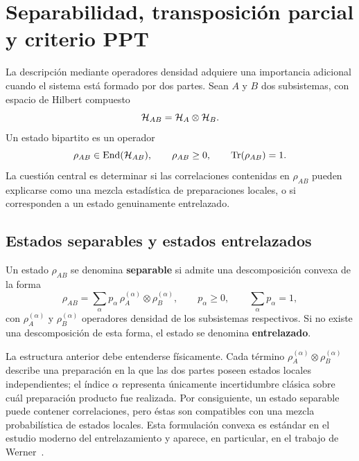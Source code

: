 \documentclass[../main.tex]{subfiles}
\begin{document}
\chapter{Separabilidad, transposición parcial y criterio PPT}\label{sec:separabilidad-ppt}

La descripción mediante operadores densidad adquiere una importancia adicional cuando el sistema está formado por dos partes. Sean $A$ y $B$ dos subsistemas, con espacio de Hilbert compuesto
\begin{equation*}
    \mathcal{H}_{AB}=\mathcal{H}_A\otimes\mathcal{H}_B.
\end{equation*}
Un estado bipartito es un operador
\begin{equation*}
    \rho_{AB}\in \operatorname{End}(\mathcal{H}_{AB}),
    \qquad
    \rho_{AB}\geq 0,
    \qquad
    \Tr(\rho_{AB})=1.
\end{equation*}
La cuestión central es determinar si las correlaciones contenidas en $\rho_{AB}$ pueden explicarse como una mezcla estadística de preparaciones locales, o si corresponden a un estado genuinamente entrelazado.

\section{Estados separables y estados entrelazados}

\begin{definicion}
Un estado $\rho_{AB}$ se denomina \textbf{separable} si admite una descomposición convexa de la forma
\begin{equation*}
    \rho_{AB}
    =\sum_{\alpha} p_{\alpha}\,
    \rho_A^{(\alpha)}\otimes\rho_B^{(\alpha)},
    \qquad
    p_{\alpha}\geq 0,
    \qquad
    \sum_{\alpha}p_{\alpha}=1,
\end{equation*}
con $\rho_A^{(\alpha)}$ y $\rho_B^{(\alpha)}$ operadores densidad de los subsistemas respectivos. Si no existe una descomposición de esta forma, el estado se denomina \textbf{entrelazado}.
\end{definicion}

La estructura anterior debe entenderse físicamente. Cada término $\rho_A^{(\alpha)}\otimes\rho_B^{(\alpha)}$ describe una preparación en la que las dos partes poseen estados locales independientes; el índice $\alpha$ representa únicamente incertidumbre clásica sobre cuál preparación producto fue realizada. Por consiguiente, un estado separable puede contener correlaciones, pero éstas son compatibles con una mezcla probabilística de estados locales. Esta formulación convexa es estándar en el estudio moderno del entrelazamiento y aparece, en particular, en el trabajo de Werner~\cite{Werner1989}.
\end{document}

